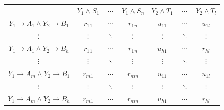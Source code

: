 \begin{small}
\begin{center}
\begin{tabular}{c|ccc|ccc|}
                 & $Y_1 \wedge S_1$  & $\cdots$ & $Y_1 \wedge S_n$
                 & $Y_2 \wedge T_1$  & $\cdots$ & $Y_2 \wedge T_l$  
                 \\ \cline{1-7} 
$Y_1 \rightarrow A_1 \wedge Y_2 \rightarrow B_1$  
                 & $r_{11}$          & $\cdots$ & $r_{1n}$  
                 & $u_{11}$          & $\cdots$ & $u_{1l}$  \\
  $\vdots$       & $\vdots$          & $\ddots$ & $\vdots$ 
                 & $\vdots$          & $\ddots$ & $\vdots$\\
$Y_1 \rightarrow A_1 \wedge Y_2 \rightarrow B_h$     
                 & $r_{11}$          & $\cdots$ & $r_{1n}$ 
                 & $u_{h1}$          & $\cdots$ & $r_{hl}$\\ \cline{1-7}

  $\vdots$       & $\vdots$          & $\ddots$ & $\vdots$ 
                 & $\vdots$          & $\ddots$ & $\vdots$\\ \cline{1-7}
                   
$Y_1 \rightarrow A_m \wedge Y_2 \rightarrow B_1$  
                 & $r_{m1}$          & $\cdots$ & $r_{mn}$  
                 & $u_{11}$          & $\cdots$ & $u_{1l}$  \\
  $\vdots$       & $\vdots$          & $\ddots$ & $\vdots$ 
                 & $\vdots$          & $\ddots$ & $\vdots$\\
$Y_1 \rightarrow A_m \wedge Y_2 \rightarrow B_h$     
                 & $r_{m1}$          & $\cdots$ & $r_{mn}$ 
                 & $u_{h1}$          & $\cdots$ & $r_{hl}$\\ \cline{1-7}
\end{tabular}
\end{center}
\end{small}

